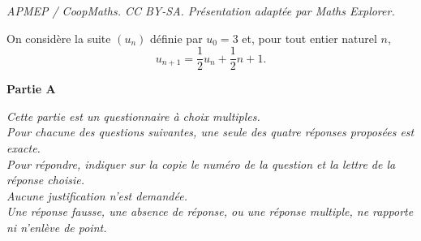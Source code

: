 \documentclass[10pt]{article}
\begin{document}
\noindent\textit{APMEP / CoopMaths. CC BY-SA. Présentation adaptée par Maths Explorer.}\par\medskip
\medskip

On considère la suite $\left(u_n\right)$ définie par $u_0 = 3$ et, pour tout entier naturel $n$,
\[u_{n+1} = \dfrac12u_n + \dfrac12n + 1.\]

\bigskip

\textbf{Partie A}

\medskip

\emph{Cette partie est un questionnaire à choix multiples.\\ Pour chacune des questions suivantes, une seule des quatre réponses proposées est exacte.\\Pour répondre, indiquer sur la copie le numéro de la question et la lettre de la réponse choisie.\\Aucune justification n'est demandée.\\Une réponse fausse, une absence de réponse, ou une réponse multiple, ne rapporte ni n'enlève de point.}

\medskip
\end{document}
